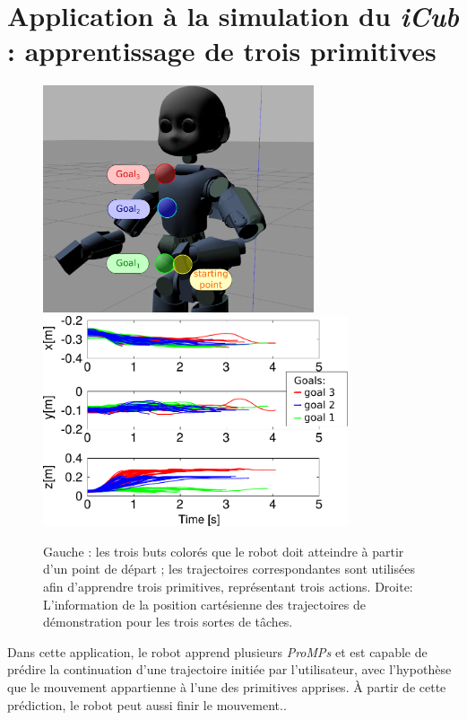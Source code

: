 \documentclass[utf8]{frontiersSCNS} %
\begin{document}
\section{Application à la simulation du \textit{iCub} : apprentissage de trois primitives}
\label{sec:3ProMPsAppli}
\begin{figure}[h]
\centering
{\includegraphics[width=8cm]{img/gazeboGoalsV2.pdf}
\hspace{0.1cm}
\includegraphics[width=9cm]{img/3DOFtrajectories.pdf}
}
\caption{Gauche : les trois buts colorés que le robot doit atteindre à partir d'un point de départ ; les trajectoires correspondantes sont utilisées afin d'apprendre trois primitives, représentant trois actions. 
Droite: L'information de la position cartésienne des trajectoires de démonstration pour les trois sortes de tâches.}%
\label{fig:3TargetsTrajectories}
\label{fig:GazeboGoal}
\end{figure}

Dans cette application, le robot apprend plusieurs \textit{ProMPs} et est capable de prédire la continuation d'une trajectoire initiée par l'utilisateur, avec l'hypothèse que le mouvement appartienne à l'une des primitives apprises. À partir de cette prédiction, le robot peut aussi finir le mouvement.. 
\end{document}
